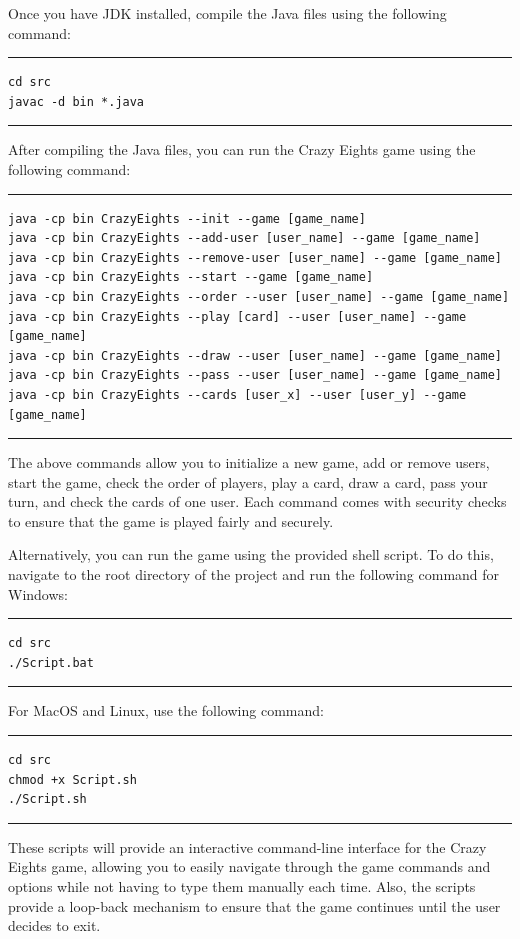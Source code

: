 \documentclass[conference]{IEEEtran}
\begin{document}
Once you have JDK installed, compile the Java files using the following command:
\vspace{0.5cm}
\hrule 
\begin{lstlisting}[style=input]
cd src 
javac -d bin *.java
\end{lstlisting}
\hrule 
\vspace{0.5cm}

After compiling the Java files, you can run the Crazy Eights game using the following command:
\vspace{0.5cm}
\hrule 
\begin{lstlisting}[style=input]
java -cp bin CrazyEights --init --game [game_name]
java -cp bin CrazyEights --add-user [user_name] --game [game_name]
java -cp bin CrazyEights --remove-user [user_name] --game [game_name]
java -cp bin CrazyEights --start --game [game_name]
java -cp bin CrazyEights --order --user [user_name] --game [game_name]
java -cp bin CrazyEights --play [card] --user [user_name] --game [game_name]
java -cp bin CrazyEights --draw --user [user_name] --game [game_name]
java -cp bin CrazyEights --pass --user [user_name] --game [game_name]
java -cp bin CrazyEights --cards [user_x] --user [user_y] --game [game_name]
\end{lstlisting}
\hrule 
\vspace{0.5cm}
The above commands allow you to initialize a new game, add or remove users, start the game, check the order of players, play a card, draw a card, pass your turn, and check the cards of one user. Each command comes with security checks to ensure that the game is played fairly and securely.

Alternatively, you can run the game using the provided shell script. To do this, navigate to the root directory of the project and run the following command for Windows:

\vspace{0.5cm}
\hrule
\begin{lstlisting}[style=input]
cd src 
./Script.bat
\end{lstlisting}
\hrule
\vspace{0.5cm}

For MacOS and Linux, use the following command:
\vspace{0.5cm}
\hrule
\begin{lstlisting}[style=input]
cd src
chmod +x Script.sh
./Script.sh
\end{lstlisting}
\hrule
\vspace{0.5cm}
These scripts will provide an interactive command-line interface for the Crazy Eights game, allowing you to easily navigate through the game commands and options while not having to type them manually each time. Also, the scripts provide a loop-back mechanism to ensure that the game continues until the user decides to exit.
\end{document}
